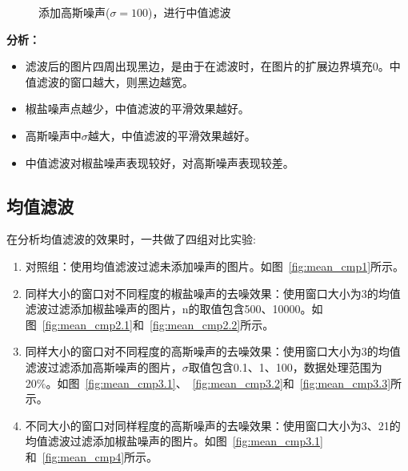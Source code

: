 \documentclass[lang=cn,10pt]{elegantbook}
\begin{document}
\begin{figure}[htbp]
	\centering
	\caption{添加高斯噪声($\sigma=100$)，进行中值滤波}
	\label{fig:median_cmp3.3}
\end{figure}


\vspace{50pt}
\quad \textcolor{second}{\textbf{分析：}}
\begin{itemize}
\item 滤波后的图片四周出现黑边，是由于在滤波时，在图片的扩展边界填充0。中值滤波的窗口越大，则黑边越宽。

\item 椒盐噪声点越少，中值滤波的平滑效果越好。

\item 高斯噪声中$\sigma$越大，中值滤波的平滑效果越好。

\item 中值滤波对椒盐噪声表现较好，对高斯噪声表现较差。

\end{itemize}


\subsection{均值滤波}

在分析均值滤波的效果时，一共做了四组对比实验:
\vspace{5pt}
\begin{enumerate}[itemsep=1.5ex]

\item 对照组：使用均值滤波过滤未添加噪声的图片。如图~\ref{fig:mean_cmp1}所示。

\item 同样大小的窗口对不同程度的椒盐噪声的去噪效果：使用窗口大小为3的均值滤波过滤添加椒盐噪声的图片，n的取值包含500、10000。如图~\ref{fig:mean_cmp2.1}和~\ref{fig:mean_cmp2.2}所示。

\item 同样大小的窗口对不同程度的高斯噪声的去噪效果：使用窗口大小为3的均值滤波过滤添加高斯噪声的图片，$\sigma$取值包含0.1、1、100，数据处理范围为20\%。如图~\ref{fig:mean_cmp3.1}、~\ref{fig:mean_cmp3.2}和~\ref{fig:mean_cmp3.3}所示。

\item 不同大小的窗口对同样程度的高斯噪声的去噪效果：使用窗口大小为3、21的均值滤波过滤添加椒盐噪声的图片。如图~\ref{fig:mean_cmp3.1}和~\ref{fig:mean_cmp4}所示。

\end{enumerate}
\end{document}
